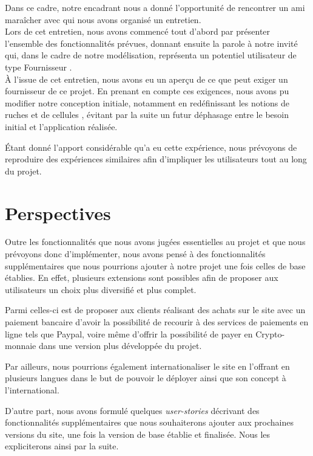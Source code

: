 \documentclass[a4paper,12pt]{report}
\theoremstyle{break}
\theoremstyle{break}
\theoremstyle{break}
\theoremstyle{break}
\theoremstyle{definition}
\theoremstyle{remark}
\begin{document}
Dans ce cadre, notre encadrant nous a donné l'opportunité de rencontrer un ami maraîcher avec qui nous avons organisé un entretien.\\
Lors de cet entretien, nous avons commencé tout d'abord par présenter l'ensemble des fonctionnalités prévues, donnant ensuite la parole à notre invité qui, dans le cadre de notre modélisation, représenta un potentiel utilisateur de type \og Fournisseur \fg.\\
À l'issue de cet entretien, nous avons eu un aperçu de ce que peut exiger un fournisseur de ce projet.
En prenant en compte ces exigences, nous avons pu modifier notre conception initiale, notamment en redéfinissant les notions de \og ruches \fg et de \og cellules \fg, évitant par la suite un futur déphasage entre le besoin initial et l'application réalisée.

Étant donné l'apport considérable qu'a eu cette expérience, nous prévoyons de reproduire des expériences similaires afin d'impliquer les utilisateurs tout au long du projet.
\section{Perspectives}
\label{sec:perspectives}
Outre les fonctionnalités que nous avons jugées essentielles au projet et que nous prévoyons donc d'implémenter, nous avons pensé à des fonctionnalités supplémentaires que nous pourrions ajouter à notre projet une fois celles de base établies. En effet, plusieurs extensions sont possibles afin de proposer aux utilisateurs un choix plus diversifié et plus complet.

Parmi celles-ci est de proposer aux clients réalisant des achats sur le site avec un paiement bancaire d'avoir la possibilité de recourir à des services de paiements en ligne tels que Paypal, voire même d'offrir la possibilité de payer en Crypto-monnaie dans une version plus développée du projet.

Par ailleurs, nous pourrions également internationaliser le site en l'offrant en plusieurs langues dans le but de pouvoir le déployer ainsi que son concept à l'international.

D'autre part, nous avons formulé quelques \textit{user-stories} décrivant des fonctionnalités supplémentaires que nous souhaiterons ajouter aux prochaines versions du site, une fois la version de base établie et finalisée. Nous les expliciterons ainsi par la suite.
\end{document}
